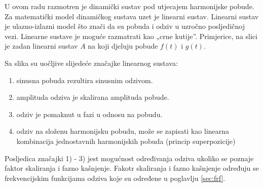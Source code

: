 U ovom radu razmotren je dinamički sustav pod utjecajem harmonijske pobude. Za
matematički model dinamičkog sustava uzet je linearni sustav. Linearni sustav je
ulazno-izlazni model što znači da su pobuda i odziv u uzročno posljedičnoj vezi.
Linearne sustave je moguće razmatrati kao „crne kutije”. Primjerice, na slici je
zadan linearni sustav $A$ na koji djeluju pobude $f(t)$ i $g(t)$.


Sa slika su uočljive slijedeće značajke linearnog sustava: 
\begin{enumerate}
    \item sinusna pobuda rezultira sinusnim odzivom.
    \item amplituda odziva je skalirana amplituda pobude. 
    \item odziv je pomaknut u fazi u odnosu na pobudu.  
    \item odziv na složenu harmonijsku pobudu, može se zapisati kao linearna
    kombinacija jednostavnih harmonijskih pobuda (princip superpozicije)
\end{enumerate}


Posljedica značajki 1) - 3) jest mogućnost određivanja odziva ukoliko se poznaje
faktor skaliranja i fazno kašnjenje. Fakotr skaliranja i fazno kašnjenje određuju se
frekvencijskim funkcijama odziva koje su određene u poglavlju \ref{sec:frf}. 
